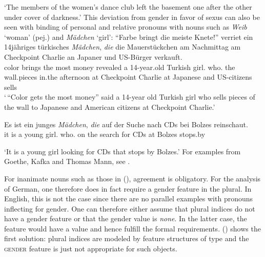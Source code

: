 \glt `The members of the women's dance club left the basement one after the other under cover of darkness.'
\zl
This deviation from gender in favor of sexus can also be seen with binding of personal and relative pronouns with nouns such as
\emph{Weib} `woman' (pej.) and \emph{Mädchen} `girl':
\eal
\ex 
\gll "`Farbe bringt die meiste Knete!"' verriet ein 14jähriges türkisches {\em Mädchen\/}, {\em die\/} die Mauerstückchen am
      Nachmittag am Checkpoint Charlie an Japaner und US-Bürger verkauft.\footnotemark\\
color brings the most money revealed a 14-year.old Turkish girl.\neu{} who.\fem{} the wall.pieces
in.the afternoon at Checkpoint Charlie at Japanese and US-citizens sells\\  
\glt `\,``Color gets the most money'' said a 14-year old Turkish girl who sells pieces of the wall to Japanese and American citizens
at Checkpoint Charlie.'
\ex 
{\raggedright
\gll Es ist ein junges {\em Mädchen\/}, {\em die\/} auf der Suche nach CDs bei Bolzes reinschaut.\footnotemark\\
	 it is a young girl.\neu{} who.\fem{} on the search for CDs at Bolzes stops.by\\
\par}
\glt `It is a young girl looking for CDs that stops by Bolzes.' 
\zl
For examples from Goethe, Kafka and Thomas Mann, see . 

For inanimate nouns such as those in (), agreement is obligatory. For the analysis of
German, one therefore does in fact require a gender feature in the plural. In English, this is not
the case since there are no parallel examples with pronouns inflecting for gender. One can therefore
either assume that plural indices do not have a gender feature or that the gender value is
\emph{none}. In the latter case, the feature would have a value and hence fulfill the formal requirements.
() shows the first solution: plural indices are modeled by feature structures of
type  and the \textsc{gender} feature is just not appropriate for such objects.

